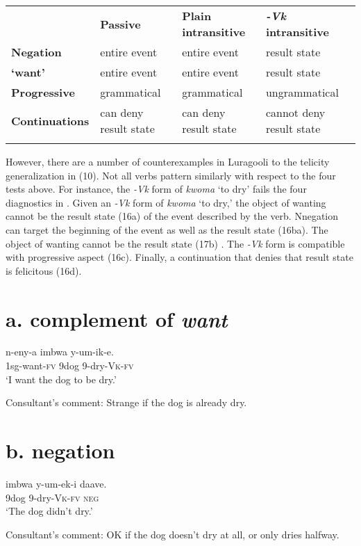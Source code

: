 \documentclass[output=paper]{langsci/langscibook}
\begin{document}
\begin{styleTabellenberschrift}
\begin{tabularx}{\textwidth}{XXXX} & \textbf{Passive} & \textbf{Plain intransitive} & \textbf{\textit{{}-Vk}}\textbf{ intransitive}\\
\lsptoprule
\textbf{Negation} & entire event & entire event & result state\\
\textbf{‘want’} & entire event & entire event & result state\\
\textbf{Progressive} & grammatical & grammatical & ungrammatical\\
\textbf{Continuations} & can deny result state & can deny result state & cannot deny result state\\
\lspbottomrule
\end{tabularx}
However, there are a number of counterexamples in Luragooli to the telicity generalization in (10). Not all verbs pattern similarly with respect to the four tests above. For instance, the \textit{{}-Vk} form of \textit{kwoma} ‘to dry’ fails the four diagnostics in . Given an \textit{{}-Vk} form of \textit{kwoma }‘to dry,’ the object of wanting cannot be the result state (16a) of the event described by the verb. Nnegation can target the beginning of the event as well as the result state (16ba). The object of wanting cannot be the result state (17b) . The \textit{{}-Vk} form is compatible with progressive aspect (16c). Finally, a continuation that denies that result state is felicitous (16d).

\chapter[a. complement of want]{a. \textbf{complement of }\textbf{\textit{want}}}
\gll n-eny-a          imbwa y-um-ik-e.\\
     1sg-want-\textsc{fv} 9dog    9-dry-\textsc{Vk}{}-\textsc{fv}\\
\glt ‘I want the dog to be dry.’
\z

\glt Consultant’s comment: Strange if the dog is already dry.
\z

\chapter[b. negation]{b. \textbf{negation}}
\gll imbwa y-um-ek-i     daave.\\
     9dog    9-dry-\textsc{Vk}{}-\textsc{fv} \textsc{neg}\\
\glt ‘The dog didn’t dry.’
\z

\glt Consultant’s comment: OK if the dog doesn’t dry at all, or only dries halfway.
\z


\end{styleTabellenberschrift}
\end{document}
